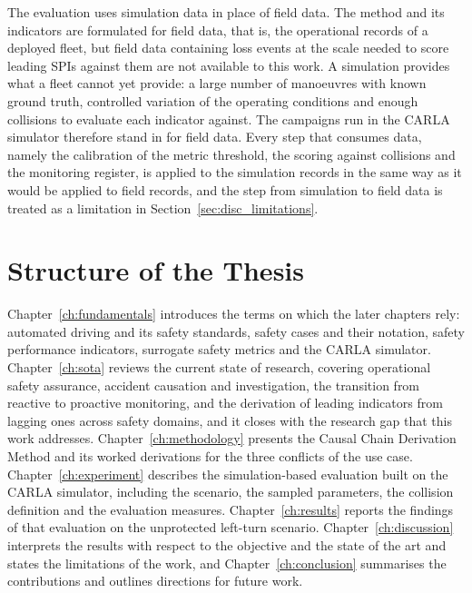 The evaluation uses simulation data in place of field data. The method and its
indicators are formulated for field data, that is, the operational records of a
deployed fleet, but field data containing loss events at the scale needed to score
leading \acp{SPI} against them are not available to this work. A simulation
provides what a fleet cannot yet provide: a large number of manoeuvres with known
ground truth, controlled variation of the operating conditions and enough
collisions to evaluate each indicator against. The campaigns run in the \ac{CARLA}
simulator therefore stand in for field data. Every step that consumes data, namely the calibration of
the metric threshold, the scoring against collisions and the monitoring register,
is applied to the simulation records in the same way as it would be applied to
field records, and the step from simulation to field data is treated as a
limitation in Section~\ref{sec:disc_limitations}.

\section{Structure of the Thesis}
\label{sec:intro_structure}

Chapter~\ref{ch:fundamentals} introduces the terms on which the later chapters rely:
automated driving and its safety standards, safety cases and their notation, safety
performance indicators, surrogate safety metrics and the CARLA simulator. Chapter~\ref{ch:sota} reviews the current state
of research, covering operational safety assurance, accident causation and
investigation, the transition from reactive to proactive monitoring, and the derivation
of leading indicators from lagging ones across safety domains, and it closes with the
research gap that this work addresses. Chapter~\ref{ch:methodology} presents the Causal
Chain Derivation Method and its worked derivations for the three conflicts of the use
case. Chapter~\ref{ch:experiment} describes the simulation-based evaluation built on
the CARLA simulator, including the scenario, the sampled parameters, the collision
definition and the evaluation measures. Chapter~\ref{ch:results} reports the findings
of that evaluation on the unprotected left-turn scenario. Chapter~\ref{ch:discussion} interprets the
results with respect to the objective and the state of the art and states the
limitations of the work, and Chapter~\ref{ch:conclusion} summarises the contributions
and outlines directions for future work.
